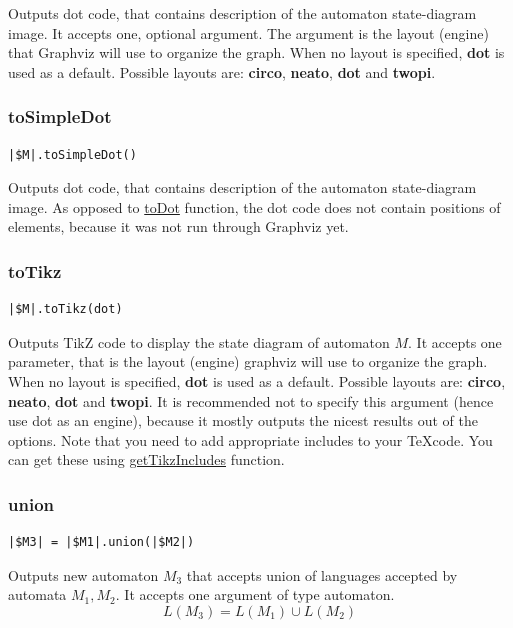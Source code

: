 \documentclass{ctuthesis}
\begin{document}
Outputs dot code, that contains description of the automaton state-diagram image. It accepts one, optional argument. The argument is the layout (engine) that Graphviz will use to organize the graph. When no layout is specified, \textbf{dot} is used as a default. Possible layouts are: \textbf{circo}, \textbf{neato}, \textbf{dot} and \textbf{twopi}. 

\subsubsection{toSimpleDot}
\begin{lstlisting}[language = JASL_snippet]
	|$M|.toSimpleDot()
\end{lstlisting}

Outputs dot code, that contains description of the automaton state-diagram image. As opposed to \hyperref[subsec:toDot]{toDot} function, the dot code does not contain positions of elements, because it was not run through Graphviz yet. 

\subsubsection{toTikz}
\begin{lstlisting}[language = JASL_snippet]
	|$M|.toTikz(dot)
\end{lstlisting}

Outputs TikZ code to display the state diagram of automaton $M$. It accepts one parameter, that is the layout (engine) graphviz will use to organize the graph. When no layout is specified, \textbf{dot} is used as a default. Possible layouts are: \textbf{circo}, \textbf{neato}, \textbf{dot} and \textbf{twopi}. It is recommended not to specify this argument (hence use dot as an engine), because it mostly outputs the nicest results out of the options. Note that you need to add appropriate includes to your \TeX code. You can get these using \hyperref[subsec:getTikzIncludes]{getTikzIncludes} function.

\subsubsection{union}
\begin{lstlisting}[language = JASL_snippet]
	|$M3| = |$M1|.union(|$M2|)
\end{lstlisting}

Outputs new automaton $M_3$ that accepts union of languages accepted by automata $M_1, M_2$. It accepts one argument of type automaton.
\begin{equation*}
L(M_3) = L(M_1) \cup L(M_2)
\end{equation*}
\end{document}
